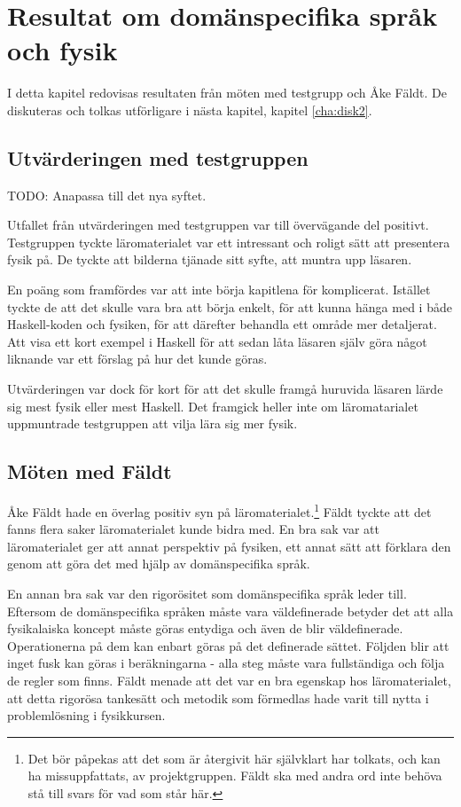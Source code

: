 
\chapter{Resultat om domänspecifika språk och fysik}

\begin{draft}

I detta kapitel redovisas resultaten från möten med testgrupp och Åke Fäldt. De diskuteras och tolkas utförligare i nästa kapitel, kapitel \ref{cha:disk2}.

\section{Utvärderingen med testgruppen}

TODO: Anapassa till det nya syftet.

Utfallet från utvärderingen med testgruppen var till övervägande del positivt. Testgruppen tyckte läromaterialet var ett intressant och roligt sätt att presentera fysik på. De tyckte att bilderna tjänade sitt syfte, att muntra upp läsaren. 

En poäng som framfördes var att inte börja kapitlena för komplicerat. Istället tyckte de att det skulle vara bra att börja enkelt, för att kunna hänga med i både Haskell-koden och fysiken, för att därefter behandla ett område mer detaljerat. Att visa ett kort exempel i Haskell för att sedan låta läsaren själv göra något liknande var ett förslag på hur det kunde göras.

Utvärderingen var dock för kort för att det skulle framgå huruvida läsaren lärde sig mest fysik eller mest Haskell. Det framgick heller inte om läromatarialet uppmuntrade testgruppen att vilja lära sig mer fysik.

\section{Möten med Fäldt}

Åke Fäldt hade en överlag positiv syn på läromaterialet.\footnote{Det bör påpekas att det som är återgivit här självklart har tolkats, och kan ha missuppfattats, av projektgruppen. Fäldt ska med andra ord inte behöva stå till svars för vad som står här.} Fäldt tyckte att det fanns flera saker läromaterialet kunde bidra med. En bra sak var att läromaterialet ger att annat perspektiv på fysiken, ett annat sätt att förklara den genom att göra det med hjälp av domänspecifika språk.

En annan bra sak var den rigorösitet som domänspecifika språk leder till. Eftersom de domänspecifika språken måste vara väldefinerade betyder det att alla fysikalaiska koncept måste göras entydiga och även de blir väldefinerade. Operationerna på dem kan enbart göras på det definerade sättet. Följden blir att inget fusk kan göras i beräkningarna - alla steg måste vara fullständiga och följa de regler som finns. Fäldt menade att det var en bra egenskap hos läromaterialet, att detta rigorösa tankesätt och metodik som förmedlas hade varit till nytta i problemlösning i fysikkursen.


\end{draft}
